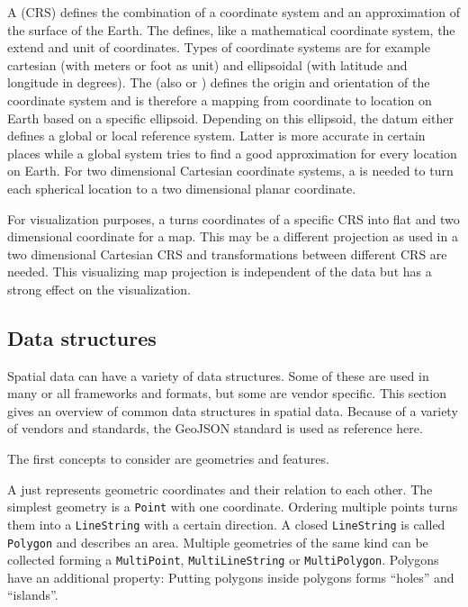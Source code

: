 		A  (CRS) defines the combination of a coordinate system and an approximation of the surface of the Earth.
		The  defines, like a mathematical coordinate system, the extend and unit of coordinates.
		Types of coordinate systems are for example cartesian (with meters or foot as unit) and ellipsoidal (with latitude and longitude in degrees)\cite[11-13]{ordenance-survey-booklet}.
		The  (also  or ) defines the origin and orientation of the coordinate system and is therefore a mapping from coordinate to location on Earth based on a specific ellipsoid.
		Depending on this ellipsoid, the datum either defines a global or local reference system.
		Latter is more accurate in certain places while a global system tries to find a good approximation for every location on Earth.
		For two dimensional Cartesian coordinate systems, a  is needed to turn each  spherical location to a two dimensional planar coordinate\cite[17]{ordenance-survey-booklet}.
		
		For visualization purposes, a  turns coordinates of a specific CRS into flat and two dimensional coordinate for a map.
		This may be a different projection as used in a two dimensional Cartesian CRS and transformations between different CRS are needed.
		This visualizing map projection is independent of the data but has a strong effect on the visualization.

	\subsection{Data structures}
	
		Spatial data can have a variety of data structures.
		Some of these are used in many or all frameworks and formats, but some are vendor specific.
		This section gives an overview of common data structures in spatial data.
		Because of a variety of vendors and standards, the GeoJSON standard is used as reference here.
		
		
		The first concepts to consider are geometries and features.
		
		A  just represents geometric coordinates and their relation to each other.
		The simplest geometry is a \texttt{Point} with one coordinate.
		Ordering multiple points turns them into a \texttt{LineString} with a certain direction.
		A closed \texttt{LineString} is called \texttt{Polygon} and describes an area.
		Multiple geometries of the same kind can be collected forming a \texttt{MultiPoint}, \texttt{MultiLineString} or \texttt{MultiPolygon}.
		Polygons have an additional property:
		Putting polygons inside polygons forms \enquote{holes} and \enquote{islands}.
		
